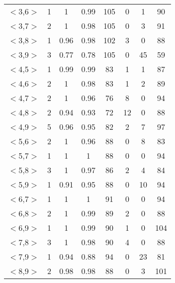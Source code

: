 \documentclass[11pt,letterpaper,oneside]{article}
\begin{document}
\begin{table}[th]
\begin{tabular*}{\textwidth}{@{\extracolsep{\fill}}cccccccc}
$<$3,6$>$ & 1 & 1 & 0.99 & 105 & 0 & 1 & 90\\
$<$3,7$>$ & 2 & 1 & 0.98 & 105 & 0 & 3 & 91\\
$<$3,8$>$ & 1 & 0.96 & 0.98 & 102 & 3 & 0 & 88\\
$<$3,9$>$ & 3 & 0.77 & 0.78 & 105 & 0 & 45 & 59\\
$<$4,5$>$ & 1 & 0.99 & 0.99 & 83 & 1 & 1 & 87\\
$<$4,6$>$ & 2 & 1 & 0.98 & 83 & 1 & 2 & 89\\
$<$4,7$>$ & 2 & 1 & 0.96 & 76 & 8 & 0 & 94\\
$<$4,8$>$ & 2 & 0.94 & 0.93 & 72 & 12 & 0 & 88\\
$<$4,9$>$ & 5 & 0.96 & 0.95 & 82 & 2 & 7 & 97\\
$<$5,6$>$ & 2 & 1 & 0.96 & 88 & 0 & 8 & 83\\
$<$5,7$>$ & 1 & 1 & 1 & 88 & 0 & 0 & 94\\
$<$5,8$>$ & 3 & 1 & 0.97 & 86 & 2 & 4 & 84\\
$<$5,9$>$ & 1 & 0.91 & 0.95 & 88 & 0 & 10 & 94\\
$<$6,7$>$ & 1 & 1 & 1 & 91 & 0 & 0 & 94\\
$<$6,8$>$ & 2 & 1 & 0.99 & 89 & 2 & 0 & 88\\
$<$6,9$>$ & 1 & 1 & 0.99 & 90 & 1 & 0 & 104\\
$<$7,8$>$ & 3 & 1 & 0.98 & 90 & 4 & 0 & 88\\
$<$7,9$>$ & 1 & 0.94 & 0.88 & 94 & 0 & 23 & 81\\
$<$8,9$>$ & 2 & 0.98 & 0.98 & 88 & 0 & 3 & 101\\
\hline
\end{tabular*}
\label{tab2}
\end{table}
\end{document}
